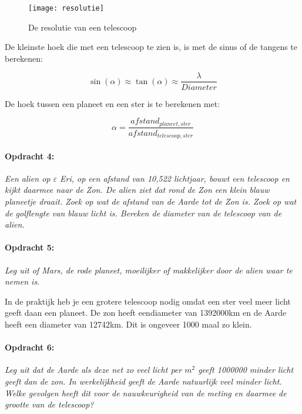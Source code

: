 \begin{figure}[H]
\noindent \begin{centering}
\texttt{[image: resolutie]}
\par\end{centering}

\caption{De resolutie van een telescoop}
\end{figure}


De kleinste hoek die met een telescoop te zien is, is met de sinus
of de tangens te berekenen:

\begin{equation}
\sin(\alpha)\approx \tan(\alpha)\approx\frac{\lambda}{Diameter}
\end{equation}


De hoek tussen een planeet en een ster is te berekenen met:

\begin{equation}
\alpha=\frac{afstand_{planeet,ster}}{afstand_{telescoop,ster}}
\end{equation}


\paragraph*{Opdracht 4:}

\emph{Een alien op $\varepsilon$ Eri, op een afstand van 10,522 lichtjaar,
bouwt een telescoop en kijkt daarmee naar de Zon. De alien ziet dat
rond de Zon een klein blauw planeetje draait. Zoek op wat de afstand
van de Aarde tot de Zon is. Zoek op wat de golflengte van blauw licht
is. Bereken de diameter van de telescoop van de alien.}


\paragraph*{Opdracht 5:}

\emph{Leg uit of Mars, de rode planeet, moeilijker of makkelijker
door de alien waar te nemen is.}

In de praktijk heb je een grotere telescoop nodig omdat een ster veel
meer licht geeft daan een planeet. De zon heeft eendiameter van 1392000km
en de Aarde heeft een diameter van 12742km. Dit is ongeveer 1000 maal
zo klein.


\paragraph*{Opdracht 6:}

\emph{Leg uit dat de Aarde als deze net zo veel licht per $m^{2}$
geeft 1000000 minder licht geeft dan de zon. In werkelijkheid geeft
de Aarde natuurlijk veel minder licht. Welke gevolgen heeft dit voor
de nauwkeurigheid van de meting en daarmee de grootte van de telescoop?}


